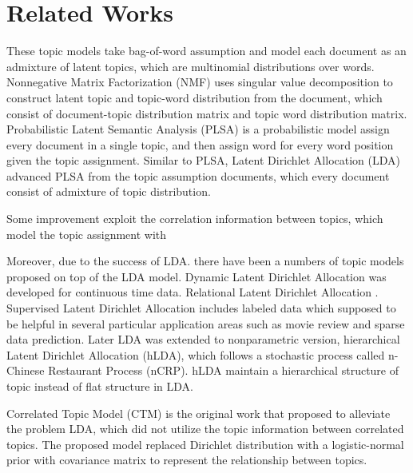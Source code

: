 \section{Related Works}\label{ch1:3}
These topic models take bag-of-word assumption and model each document as an admixture of latent topics, which are multinomial distributions over words.
Nonnegative Matrix Factorization (NMF) \cite{lee_learning_1999} uses singular value decomposition to construct latent topic and topic-word distribution from the document, which consist of document-topic distribution matrix and topic word distribution matrix.
Probabilistic Latent Semantic Analysis (PLSA) \cite{hofmann_probabilistic_2013} is a probabilistic model assign every document in a single topic, and then assign word for every word position given the topic assignment.
Similar to PLSA, Latent Dirichlet Allocation (LDA) \cite{blei_latent_2003} advanced PLSA from the topic assumption documents, which every document consist of admixture of topic distribution.

Some improvement exploit the correlation information between topics, which model the topic assignment with 

Moreover, due to the  success of LDA. there have been a numbers of topic models proposed on top of the LDA model. Dynamic Latent Dirichlet Allocation\cite{blei_probabilistic_2012} was developed for continuous time data. Relational Latent Dirichlet Allocation \cite{chang_relational_nodate} . Supervised Latent Dirichlet Allocation \cite{mcauliffe_supervised_2008} includes labeled data which supposed to be helpful in several particular application areas such as movie review and sparse data prediction. Later LDA was extended to nonparametric version, hierarchical Latent Dirichlet Allocation (hLDA)\cite{teh_hierarchical_2006}, which follows a stochastic process called n-Chinese Restaurant Process (nCRP)\cite{teh_tutorial_nodate}. hLDA maintain a hierarchical structure of topic instead of flat structure in LDA. %

Correlated Topic Model (CTM)\cite{blei_correlated_2007} is the original work that proposed to alleviate the problem LDA, which did not utilize the topic information between correlated topics. The proposed model replaced Dirichlet distribution with a logistic-normal prior with covariance matrix to represent the relationship between topics.
% 

